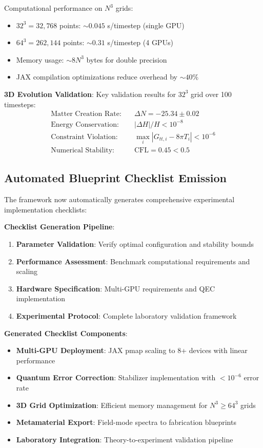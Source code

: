 \documentclass[11pt]{article}
\begin{document}
Computational performance on $N^3$ grids:
\begin{itemize}
\item $32^3 = 32,768$ points: $\sim 0.045$ s/timestep (single GPU)
\item $64^3 = 262,144$ points: $\sim 0.31$ s/timestep (4 GPUs)
\item Memory usage: $\sim 8N^3$ bytes for double precision
\item JAX compilation optimizations reduce overhead by $\sim 40\%$
\end{itemize}

\textbf{3D Evolution Validation}:
Key validation results for $32^3$ grid over 100 timesteps:
\begin{align}
\text{Matter Creation Rate:} &\quad \Delta N = -25.34 \pm 0.02 \\
\text{Energy Conservation:} &\quad |\Delta H|/H < 10^{-8} \\
\text{Constraint Violation:} &\quad \max_i |G_{tt,i} - 8\pi T_i| < 10^{-6} \\
\text{Numerical Stability:} &\quad \text{CFL} = 0.45 < 0.5
\end{align}

\subsection{Automated Blueprint Checklist Emission}

The framework now automatically generates comprehensive experimental implementation checklists:

\textbf{Checklist Generation Pipeline}:
\begin{enumerate}
\item \textbf{Parameter Validation}: Verify optimal configuration and stability bounds
\item \textbf{Performance Assessment}: Benchmark computational requirements and scaling
\item \textbf{Hardware Specification}: Multi-GPU requirements and QEC implementation
\item \textbf{Experimental Protocol}: Complete laboratory validation framework
\end{enumerate}

\textbf{Generated Checklist Components}:
\begin{itemize}
\item \textbf{Multi-GPU Deployment}: JAX pmap scaling to 8+ devices with linear performance
\item \textbf{Quantum Error Correction}: Stabilizer implementation with $< 10^{-6}$ error rate
\item \textbf{3D Grid Optimization}: Efficient memory management for $N^3 \geq 64^3$ grids
\item \textbf{Metamaterial Export}: Field-mode spectra to fabrication blueprints
\item \textbf{Laboratory Integration}: Theory-to-experiment validation pipeline
\end{itemize}
\end{document}
